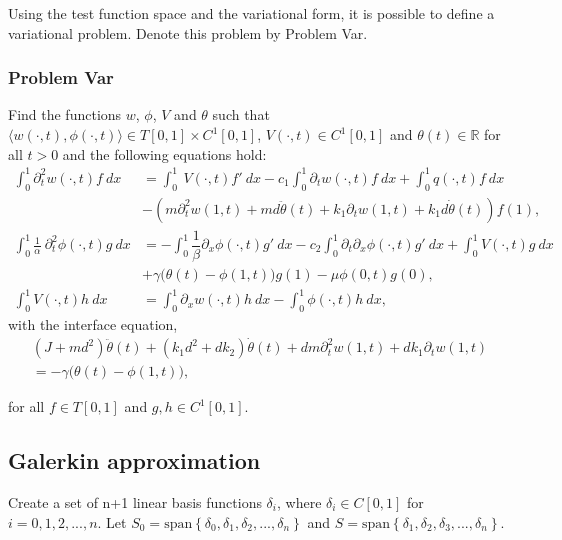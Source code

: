 \documentclass[../../main.tex]{subfiles}
\begin{document}
Using the test function space and the variational form, it is possible to define a variational problem. Denote this problem by Problem Var.

\subsubsection{Problem Var} Find the functions $w$, $\phi$, $V$ and $\theta$ such that $\langle w(\cdot,t), \phi(\cdot,t) \rangle \in T[0,1] \times C^1[0,1]$, $V(\cdot,t) \in C^1[0,1]$ and $\theta(t) \in \mathbb{R}$ for all $t>0$ and the following equations hold:
\begin{align}
\int_0^1 \partial^2_t w(\cdot,t) f \ dx  & =   \int_0^1~ V(\cdot,t) f' \ dx - c_1\int_0^1 \partial_t w(\cdot,t)f \ dx + \int_0^1q(\cdot,t)f \ dx \nonumber \\
 &  -(m \partial_t^2 w(1,t) +  md \ddot \theta(t) + k_1 \partial_t w(1,t) + k_1 d \dot \theta(t))f(1), \label{CT_18}\\
\int_0^1 \frac{1}{\alpha}~\partial^2_t \phi(\cdot,t) g \ dx  &= -\int_0^1\dfrac{1}{\beta} \partial_x \phi(\cdot,t)g' \ dx - c_2 \int_0^1 \partial_t \partial_x \phi(\cdot,t)g' \ dx + \int_0^1 V(\cdot,t)g \ dx \nonumber \\
 &  +\gamma \big(\theta(t) - \phi(1,t)\big)g(1) - \mu \phi(0,t)g(0), \label{CT_19}\\
\int_0^1 V(\cdot,t)h \ dx &= \int_0^1 \partial_x w(\cdot,t)h \ dx - \int_0^1 \phi(\cdot,t)h \ dx,  \label{CT_20}
\end{align}
with the interface equation,
\begin{align}
(J+ md^2) \ddot \theta(t)+ (k_1d^2 + d k_2) \dot \theta(t)  + dm \partial_t^2 w(1,t)
  + dk_1 \partial_t w(1,t) \nonumber\\
  =  -\gamma \big(\theta(t) - \phi(1,t)\big),  \label{CT_21}
\end{align}

for all $f \in T[0,1]$ and $g,h \in C^1[0,1]$.\\




\subsection{Galerkin approximation}
Create a set of n+1 linear basis functions $\delta_i$, where $\delta_i \in C[0,1]$ for $i = 0,1,2,...,n$. Let $S_0 = \textrm{span}\left\{\delta_0,\delta_1,\delta_2,...,\delta_n\right\}$ and $S = \textrm{span}\left\{\delta_1,\delta_2,\delta_3,...,\delta_n\right\}$. 
\end{document}
